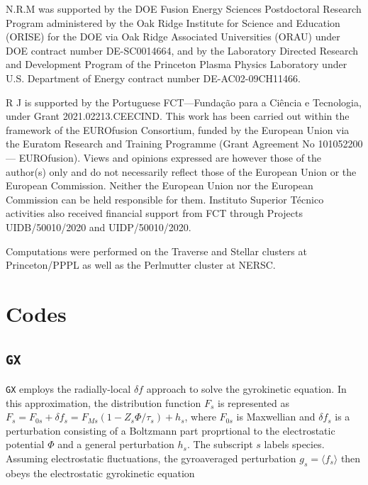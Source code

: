 \documentclass{jpp}
\begin{document}
N.R.M was supported by the DOE Fusion Energy Sciences Postdoctoral Research Program administered by the Oak Ridge Institute for Science and Education (ORISE) for the DOE via Oak Ridge
Associated Universities (ORAU) under DOE contract number DE-SC0014664, and by the Laboratory Directed Research and Development Program of the Princeton Plasma Physics Laboratory under U.S. Department of Energy contract number DE-AC02-09CH11466.

R J is supported by the Portuguese FCT—Fundação para a Ciência e Tecnologia, under Grant 2021.02213.CEECIND. This work has been carried out within the framework of the EUROfusion Consortium, funded by the European Union via the Euratom Research and Training Programme (Grant Agreement No 101052200 — EUROfusion). Views and opinions expressed are however those of the author(s) only and do not necessarily reflect those of the European Union or the European Commission. Neither the European Union nor the European Commission can be held responsible for them. Instituto Superior Técnico activities also received financial support from FCT through Projects UIDB/50010/2020 and UIDP/50010/2020.

Computations were performed on the Traverse and Stellar clusters at Princeton/PPPL as well as the Perlmutter cluster at NERSC.
\appendix
\section{Codes}\label{Codes}
\subsection{{\tt GX}}
{\tt GX} employs the radially-local $\delta\!f$ approach to solve the gyrokinetic equation. In this approximation, the distribution function $F_s$ is represented as $F_s = F_{0s} + \delta\! f_s = F_{Ms}\left(1 - Z_s \Phi/\tau_s\right) + h_s$, where $F_{0s}$ is Maxwellian and $\delta \! f_s$ is a perturbation consisting of a Boltzmann part proprtional to the electrostatic potential $\Phi$ and a general perturbation $h_s$. The subscript $s$ labels species. Assuming electrostatic fluctuations, the gyroaveraged perturbation $g_s = \langle f_s \rangle$ then obeys the electrostatic gyrokinetic equation
\end{document}
